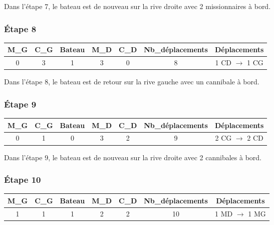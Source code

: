\documentclass{article}
\begin{document}
\noindent Dans l'étape 7, le bateau est de nouveau sur la rive droite avec 2 missionnaires à bord.

\subsubsection{Étape 8}

\begin{center}
\begin{tabular}{|c|c|c|c|c|c|c|}
\hline
\textbf{M\_G} & \textbf{C\_G} & \textbf{Bateau} & \textbf{M\_D} & \textbf{C\_D} & \textbf{Nb\_déplacements} & \textbf{Déplacements} \\
\hline
0 & 3 & 1 & 3 & 0 & 8 & 1 CD $\rightarrow$ 1 CG \\
\hline
\end{tabular}
\end{center}

\noindent Dans l'étape 8, le bateau est de retour sur la rive gauche avec un cannibale à bord.

\subsubsection{Étape 9}

\begin{center}
\begin{tabular}{|c|c|c|c|c|c|c|}
\hline
\textbf{M\_G} & \textbf{C\_G} & \textbf{Bateau} & \textbf{M\_D} & \textbf{C\_D} & \textbf{Nb\_déplacements} & \textbf{Déplacements} \\
\hline
0 & 1 & 0 & 3 & 2 & 9 & 2 CG $\rightarrow$ 2 CD \\
\hline
\end{tabular}
\end{center}

\noindent Dans l'étape 9, le bateau est de nouveau sur la rive droite avec 2 cannibales à bord.

\subsubsection{Étape 10}

\begin{center}
\begin{tabular}{|c|c|c|c|c|c|c|}
\hline
\textbf{M\_G} & \textbf{C\_G} & \textbf{Bateau} & \textbf{M\_D} & \textbf{C\_D} & \textbf{Nb\_déplacements} & \textbf{Déplacements} \\
\hline
1 & 1 & 1 & 2 & 2 & 10 & 1 MD $\rightarrow$ 1 MG \\
\hline
\end{tabular}
\end{center}
\end{document}
